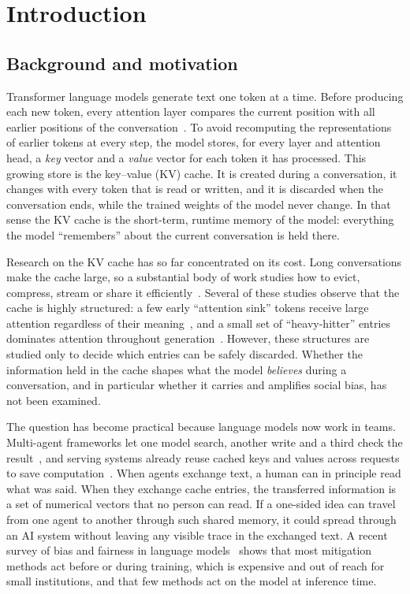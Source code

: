 \chapter{Introduction}
\section{Background and motivation}
Transformer language models generate text one token at a time. Before producing each new token, every attention layer compares the current position with all earlier positions of the conversation~\cite{vaswani2017attention}. To avoid recomputing the representations of earlier tokens at every step, the model stores, for every layer and attention head, a \emph{key} vector and a \emph{value} vector for each token it has processed. This growing store is the key--value (KV) cache. It is created during a conversation, it changes with every token that is read or written, and it is discarded when the conversation ends, while the trained weights of the model never change. In that sense the KV cache is the short-term, runtime memory of the model: everything the model ``remembers'' about the current conversation is held there.

Research on the KV cache has so far concentrated on its cost. Long conversations make the cache large, so a substantial body of work studies how to evict, compress, stream or share it efficiently~\cite{xiao2024sinks,zhang2023h2o,liu2023scissorhands,oren2024msrnn,kwon2023vllm}. Several of these studies observe that the cache is highly structured: a few early ``attention sink'' tokens receive large attention regardless of their meaning~\cite{xiao2024sinks}, and a small set of ``heavy-hitter'' entries dominates attention throughout generation~\cite{zhang2023h2o}. However, these structures are studied only to decide which entries can be safely discarded. Whether the information held in the cache shapes what the model \emph{believes} during a conversation, and in particular whether it carries and amplifies social bias, has not been examined.

The question has become practical because language models now work in teams. Multi-agent frameworks let one model search, another write and a third check the result~\cite{wu2023autogen,du2024debate}, and serving systems already reuse cached keys and values across requests to save computation~\cite{kwon2023vllm,yao2025cacheblend}. When agents exchange text, a human can in principle read what was said. When they exchange cache entries, the transferred information is a set of numerical vectors that no person can read. If a one-sided idea can travel from one agent to another through such shared memory, it could spread through an AI system without leaving any visible trace in the exchanged text. A recent survey of bias and fairness in language models~\cite{gallegos2024bias} shows that most mitigation methods act before or during training, which is expensive and out of reach for small institutions, and that few methods act on the model at inference time.


